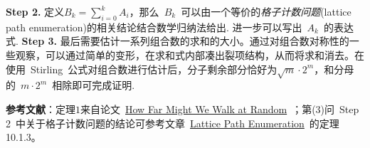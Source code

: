 \documentclass[a4paper,UTF8]{article}
\numberwithin{equation}{section}
\begin{document}
\begin{enumerate}
    \newline\noindent \textbf{Step 2.} 定义$B_k=\sum_{i=0}^k A_i$，那么~$B_k$~可以由一个等价的\emph{格子计数问题}(lattice path enumeration)的相关结论结合数学归纳法给出. 进一步可以写出~$A_k$~的表达式.
    \newline\noindent \textbf{Step 3.} 最后需要估计一系列组合数的求和的大小。通过对组合数对称性的一些观察，可以通过简单的变形，在求和式内部凑出裂项结构，从而将求和消去。在使用~Stirling~公式对组合数进行估计后，分子剩余部分恰好为$\sqrt{m}\cdot 2^m$，和分母的~$m\cdot 2^m$~相除即可完成证明.
\end{enumerate}
\textbf{参考文献}：定理$1$来自论文~\href{https://arxiv.org/pdf/1802.04615.pdf}{How Far Might We Walk at Random}~；第(3)问~Step 2~中关于格子计数问题的结论可参考文章~\href{https://arxiv.org/pdf/1503.05930.pdf}{Lattice Path Enumeration}~的定理10.1.3。
\end{document}
